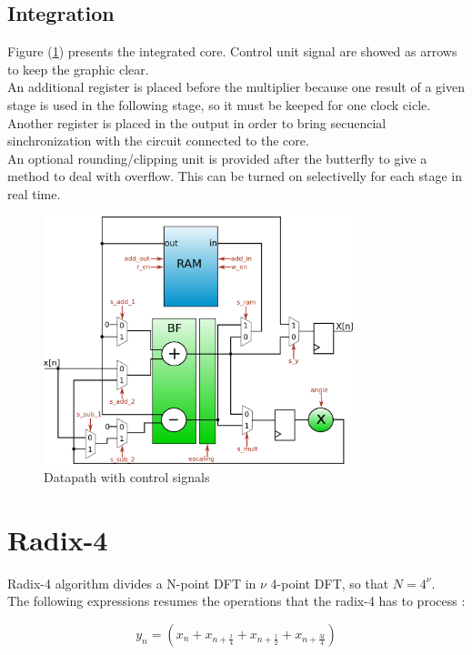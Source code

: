 \documentclass[conference]{IEEEtran}
\begin{document}
\subsection{Integration}

Figure (\ref{fig:datapathmem}) presents the integrated core. Control unit signal are showed as arrows to keep the graphic clear.\\
An additional register is placed before the multiplier because one result of a given stage is used in the following stage, so
it must be keeped for one clock cicle. Another register is placed in the output in order to bring secuencial sinchronization 
with the circuit connected to the core.\\
An optional rounding/clipping unit is provided after the butterfly to give a method to deal with overflow. This can be turned on 
selectivelly for each stage in real time. 

\begin{figure}[htb!]
        \centering
        \includegraphics[width=9cm]{./figures/datapathMem.png}
        \caption{Datapath with control signals}
        \label{fig:datapathmem}
\end{figure}
 
\section{Radix-4}

Radix-4 algorithm divides a N-point DFT in $\nu$ 4-point DFT, so that $N = 4^\nu$.\\
The following expressions resumes the operations that the radix-4 has to process \cite{MeyerRadix}:

\begin{equation}
y_n = (x_n + x_{n+\frac{l}{4}} + x_{n+\frac{l}{2}} + x_{n+\frac{3l}{4}})
\label{eq:radix4_suby}
\end{equation}
\end{document}
